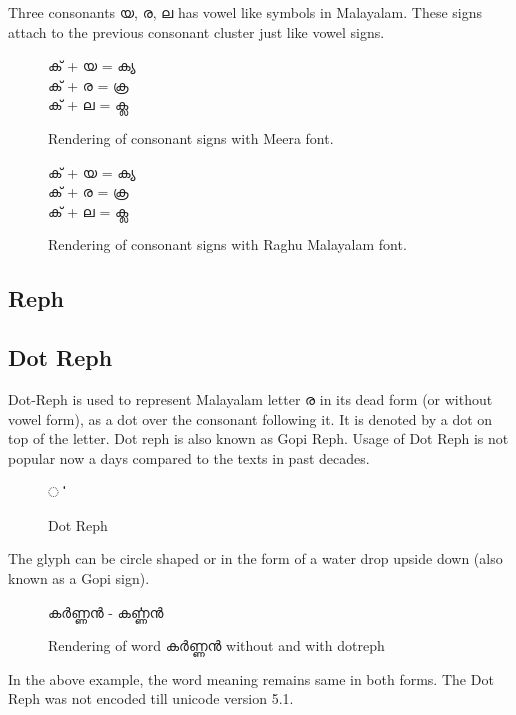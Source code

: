 Three consonants {\malayalam യ, ര, ല} has vowel like symbols in Malayalam.
These signs attach to the previous consonant cluster just like vowel signs.

\begin{figure}[h!]
  \centering
  {\meera\textexample ക് + യ = ക്യ \\ ക് + ര = ക്ര \\ ക് + ല = ക്ല }\\
  \caption{Rendering of consonant signs with Meera font.}
\end{figure}

\begin{figure}[h!]
  \centering
  {\raghumalayalam\textexample ക് + യ = ക്യ \\ ക് + ര = ക്ര \\ ക് + ല = ക്ല }\\
  \caption{Rendering of consonant signs with Raghu Malayalam font.}
\end{figure}

\subsection {Reph}
\subsection {Dot Reph}

Dot-Reph is used to represent Malayalam letter  {\meera ര} in its dead form
(or without vowel form), as a dot over the consonant following it.  It is
denoted by a dot on top of the letter. Dot reph is also known as Gopi Reph.
Usage of Dot Reph is not popular now a days compared to the texts in past
decades.

\begin{figure}[h!]
  \centering
  {\meera\textexample ൎ }\\
  \caption{Dot Reph}
\end{figure}

The glyph can be circle shaped or in the form of a water drop upside down (also
known as a Gopi sign).

\begin{figure}[h!]
  \centering
  {\meera\textexample കര്‍ണ്ണന്‍  - കൎണ്ണന്‍ }\\
  \caption{Rendering of word കര്‍ണ്ണന്‍ without and with dotreph}
\end{figure}

In the above example, the word meaning remains same in both forms. The Dot Reph
was not encoded till unicode version 5.1.

